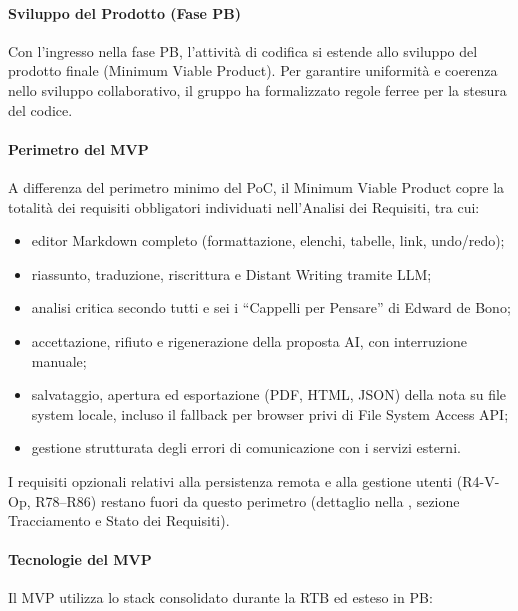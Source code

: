 \paragraph{Sviluppo del Prodotto (Fase PB)}
Con l'ingresso nella fase PB, l'attività di codifica si estende allo sviluppo del prodotto finale (Minimum Viable Product). Per garantire uniformità e coerenza nello sviluppo collaborativo, il gruppo ha formalizzato regole ferree per la stesura del codice.

\paragraph{Perimetro del MVP}

A differenza del perimetro minimo del PoC, il Minimum Viable Product copre la
totalità dei requisiti obbligatori individuati nell'Analisi dei Requisiti,
tra cui:

\begin{itemize}
    \item editor Markdown completo (formattazione, elenchi, tabelle, link, undo/redo);
    \item riassunto, traduzione, riscrittura e Distant Writing tramite LLM;
    \item analisi critica secondo tutti e sei i ``Cappelli per Pensare'' di Edward de Bono;
    \item accettazione, rifiuto e rigenerazione della proposta AI, con interruzione manuale;
    \item salvataggio, apertura ed esportazione (PDF, HTML, JSON) della nota su file system locale, incluso il fallback per browser privi di File System Access API;
    \item gestione strutturata degli errori di comunicazione con i servizi esterni.
\end{itemize}

I requisiti opzionali relativi alla persistenza remota e alla gestione utenti
(R4-V-Op, R78--R86) restano fuori da questo perimetro (dettaglio nella
, sezione Tracciamento e Stato dei Requisiti).

\paragraph{Tecnologie del MVP}

Il MVP utilizza lo stack consolidato durante la RTB ed esteso in PB:

